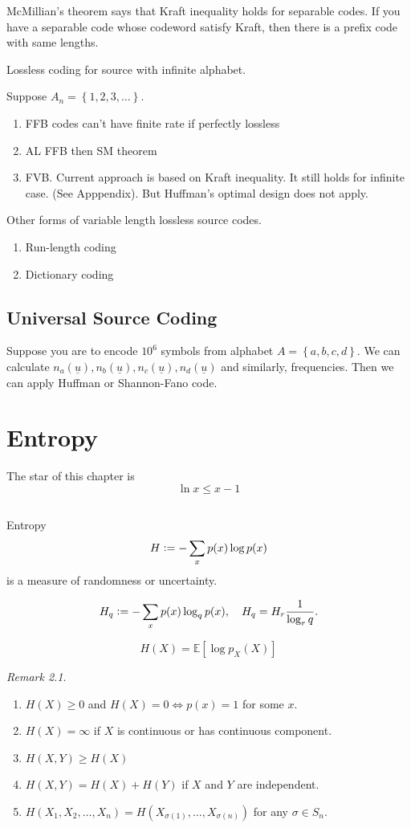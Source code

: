 \documentclass{report}
\newcommand{\set}[1]{\left\lbrace #1 \right\rbrace}
\newcommand{\defeq}{\vcentcolon=}
\theoremstyle{definition}
\theoremstyle{remark}
\newtheorem*{remark}{Remark}
\numberwithin{equation}{section}
\begin{document}
McMillian's theorem says that Kraft inequality holds for separable codes. If you have a separable code whose codeword satisfy Kraft, then there is a prefix code with same lengths.

Lossless coding for source with infinite alphabet.

Suppose $A_n = \set{1, 2, 3, \ldots}$.
\begin{enumerate}
  \item FFB codes can't have finite rate if perfectly lossless
  \item AL FFB then SM theorem
  \item FVB. Current approach is based on Kraft inequality. It still holds for infinite case. (See Apppendix). But Huffman's optimal design does not apply.
\end{enumerate}

Other forms of variable length lossless source codes.
\begin{enumerate}
  \item Run-length coding
  \item Dictionary coding
\end{enumerate}

\section{Universal Source Coding}
Suppose you are to encode $10^6$ symbols from alphabet $A = \set{a, b, c, d}$. We can calculate $n_a(\underline{u}), n_b(\underline{u}), n_c(\underline{u}), n_d(\underline{u})$ and similarly, frequencies. Then we can apply Huffman or Shannon-Fano code.


\chapter{Entropy}
The star of this chapter is \[
  \ln x \leq x - 1  
\]

\section{}

Entropy \[
  H \defeq -\sum_{x} p(x)\log p(x)
\] is a measure of randomness or uncertainty.

\[
    H_q \defeq -\sum_{x} p(x)\log_q p(x),\quad H_q = H_r \frac{1}{\log_r q}.
\]

\[
  H(X) = \mathbb{E}[\log p_X(X)]  
\]
\begin{remark}
  \begin{enumerate}
    \item $H(X) \geq 0$ and $H(X) = 0 \iff p(x) = 1$ for some $x$.
    \item $H(X) = \infty$ if $X$ is continuous or has continuous component.
    \item $H(X, Y) \geq H(X)$ 
    \item $H(X, Y) = H(X) + H(Y)$ if $X$ and $Y$ are independent.
    \item $H(X_1, X_2, \ldots, X_n) = H(X_{\sigma(1)}, \ldots, X_{\sigma(n)})$ for any $\sigma \in S_n$.
  \end{enumerate}
\end{remark}
\end{document}
